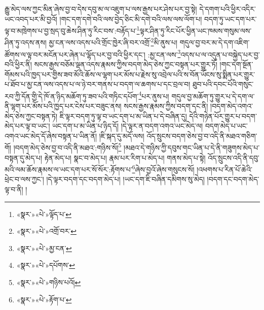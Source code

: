 རྒྱུ་མེད་ལས་ཀྱང་མིན་ཞེས་བྱ་བ་དེས་དབུ་མ་ལ་འཇུག་པ་ལས་རྒྱས་པར་ཤེས་པར་བྱ་སྟེ། དེ་དགག་པའི་ཕྱིར་འདིར་ཡང་འབད་པར་མི་བྱའོ། །གང་དག་དགེ་བའི་ལས་བྱེད་ཅིང་མི་དགེ་བའི་ལས་ལས་ལོག་པ། བདག་ཏུ་ཡང་དག་པར་ལྟ་བ་མཁྲེགས་པ་བྱ་སྲད་བུ་ཆེས་ཤིན་ཏུ་རིང་བས་:བརྟོད་པ་\footnote{«སྣར་»«པེ་»ལྟོད་པ་}ལྟར་ཤིན་ཏུ་རིང་པོར་ཕྱིན་ཡང་ཁམས་གསུམ་ལས་ཤིན་ཏུ་འདས་ནས། མྱ་ངན་ལས་འདས་པའི་གྲོང་ཁྱེར་ཞི་བར་འགྲོ་\footnote{«སྣར་»«པེ་»འགྲོ་བར་}མི་ནུས་པ། གདུལ་བྱ་བར་མ་དེ་དག་འཇིག་ཚོགས་ལ་ལྟ་བར་མངོན་པར་ཞེན་པ་ལྷོད་པར་བྱ་བའི་ཕྱིར་དང་། :མྱ་ངན་ལས་\footnote{«སྣར་»«པེ་»མྱ་ངན་}འདས་པ་ལ་འདུན་པ་བསྐྱེད་པར་བྱ་བའི་ཕྱིར་ནི། སངས་རྒྱས་བཅོམ་ལྡན་འདས་རྣམས་ཀྱིས་བདག་མེད་ཅེས་ཀྱང་བསྟན་པར་གྱུར་ཏོ། །གང་དག་སྔོན་གོམས་པའི་ཁྱད་པར་གྱིས་ཟབ་མོའི་ཆོས་ལ་ལྷག་པར་མོས་པ་རྗེས་སུ་འབྲེལ་པའི་ས་བོན་ཡོངས་སུ་སྨིན་པར་གྱུར་པ་ཐོབ་པ་མྱ་ངན་ལས་འདས་པ་ལ་ཉེ་བར་གནས་པ་བདག་ལ་ཆགས་པ་དང་བྲལ་བ། ཐུབ་པའི་དབང་པོའི་གསུང་རབ་ཀྱི་དོན་གྱི་དེ་ཁོ་ན་ཉིད་མཆོག་ཏུ་ཟབ་པའི་གཏིང་དཔོག་\footnote{«སྣར་»«པེ་»དཔོགས་}པར་ནུས་པ། གདུལ་བྱ་མཆོག་ཏུ་གྱུར་པ་དེ་དག་ལ་ནི་ལྷག་པར་མོས་པའི་ཁྱད་པར་ངེས་པར་བཟུང་ནས། སངས་རྒྱས་རྣམས་ཀྱིས་བདག་དང་ནི། །བདག་མེད་འགའ་མེད་ཅེས་ཀྱང་བསྟན་ཏེ། ཇི་ལྟར་བདག་ཏུ་ལྟ་བ་ཡང་དག་པ་མ་ཡིན་པ་དེ་བཞིན་དུ། དེའི་གཉེན་པོར་གྱུར་པ་བདག་མེད་པར་ལྟ་བ་ཡང་། ཡང་དག་པ་མ་ཡིན་པ་ཉིད་དོ། །དེ་ལྟར་ན་བདག་འགའ་ཡང་མེད་ལ། བདག་མེད་པ་ཡང་འགའ་ཡང་མེད་དོ་ཞེས་བསྟན་པ་ཡིན་ནོ། །ཇི་སྐད་དུ་མདོ་ལས། འོད་སྲུངས་བདག་ཅེས་བྱ་བ་འདི་ནི་མཐའ་གཅིག་གོ། །བདག་མེད་ཅེས་བྱ་བ་འདི་ནི་མཐའ་:གཉིས་སོ།\footnote{«སྣར་»«པེ་»གཉིས་པའོ།} །མཐའ་དེ་གཉིས་ཀྱི་དབུས་གང་ཡིན་པ་དེ་ནི་གཟུགས་མེད་པ་བསྟན་དུ་མེད་པ། རྟེན་མེད་པ། སྣང་བ་མེད་པ། རྣམ་པར་རིག་པ་མེད་པ། གནས་མེད་པ་སྟེ། འོད་སྲུངས་འདི་ནི་དབུ་མའི་ལམ་ཆོས་རྣམས་ལ་ཡང་དག་པར་སོ་སོར་:རྟོགས་པ་\footnote{«སྣར་»«པེ་»རྟོག་པ་}ཞེས་བྱའོ་ཞེས་གསུངས་སོ། །འཕགས་པ་རིན་པོ་ཆེའི་ཕྲེང་བ་ལས་ཀྱང་། །དེ་ལྟར་བདག་དང་བདག་མེད་པ། །ཡང་དག་ཇི་བཞིན་དམིགས་སུ་མེད། །བདག་དང་བདག་མེད་ལྟ་བ་ནི། །
